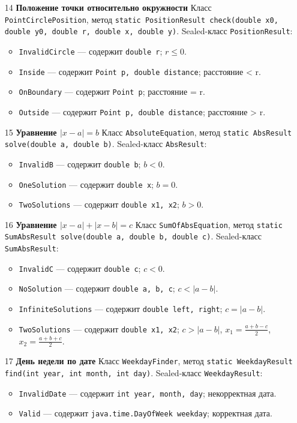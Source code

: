 \documentclass[12pt]{article}
\begin{document}
\begin{enumerate}
\item[14] \textbf{Положение точки относительно окружности}
Класс \texttt{PointCirclePosition}, метод
\texttt{static PositionResult check(double x0, double y0, double r, double x, double y)}.
Sealed-класс \texttt{PositionResult}:
\begin{itemize}
\item \texttt{InvalidCircle} — содержит \texttt{double r}; \(r \leq 0\).
\item \texttt{Inside} — содержит \texttt{Point p, double distance}; расстояние < r.
\item \texttt{OnBoundary} — содержит \texttt{Point p}; расстояние = r.
\item \texttt{Outside} — содержит \texttt{Point p, double distance}; расстояние > r.
\end{itemize}

\item[15] \textbf{Уравнение \(|x - a| = b\)}
Класс \texttt{AbsoluteEquation}, метод
\texttt{static AbsResult solve(double a, double b)}.
Sealed-класс \texttt{AbsResult}:
\begin{itemize}
\item \texttt{InvalidB} — содержит \texttt{double b}; \(b < 0\).
\item \texttt{OneSolution} — содержит \texttt{double x}; \(b = 0\).
\item \texttt{TwoSolutions} — содержит \texttt{double x1, x2}; \(b > 0\).
\end{itemize}

\item[16] \textbf{Уравнение \(|x - a| + |x - b| = c\)}
Класс \texttt{SumOfAbsEquation}, метод
\texttt{static SumAbsResult solve(double a, double b, double c)}.
Sealed-класс \texttt{SumAbsResult}:
\begin{itemize}
\item \texttt{InvalidC} — содержит \texttt{double c}; \(c < 0\).
\item \texttt{NoSolution} — содержит \texttt{double a, b, c}; \(c < |a - b|\).
\item \texttt{InfiniteSolutions} — содержит \texttt{double left, right}; \(c = |a - b|\).
\item \texttt{TwoSolutions} — содержит \texttt{double x1, x2}; \(c > |a - b|\), \(x_1 = \frac{a+b-c}{2}\), \(x_2 = \frac{a+b+c}{2}\).
\end{itemize}

\item[17] \textbf{День недели по дате}
Класс \texttt{WeekdayFinder}, метод
\texttt{static WeekdayResult find(int year, int month, int day)}.
Sealed-класс \texttt{WeekdayResult}:
\begin{itemize}
\item \texttt{InvalidDate} — содержит \texttt{int year, month, day}; некорректная дата.
\item \texttt{Valid} — содержит \texttt{java.time.DayOfWeek weekday}; корректная дата.
\end{itemize}


\end{enumerate}
\end{document}

